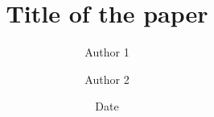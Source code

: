 \documentclass[twoside,article]{article}
\title{Title of the paper}
\author{Author 1 \and Author 2}
\date{Date}
\begin{document}
\maketitle

\cite{notsoshort}



\end{document}
